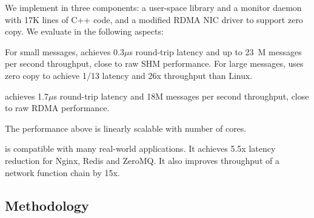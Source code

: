 
We implement \sys in three components: a user-space library \libipc{} and a monitor daemon with 17K lines of C++ code, and a modified RDMA NIC driver to support zero copy. We evaluate \sys in the following aspects:

For small messages, \sys achieves 0.3$\mu$s round-trip latency and up to 23~M messages per second throughput, close to raw SHM performance. For large messages, \sys uses zero copy to achieve 1/13 latency and 26x throughput than Linux.

\sys achieves 1.7$\mu$s round-trip latency and 18M messages per second throughput, close to raw RDMA performance.


The performance above is linearly scalable with number of cores. %


\sys{} is compatible with many real-world applications.
It achieves 5.5x latency reduction for Nginx, Redis and ZeroMQ.
It also improves throughput of a network function chain by 15x.


\subsection{Methodology}
\label{subsec:methodology}

